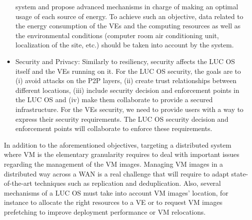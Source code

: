 \begin{itemize}
system and propose advanced mechanisms in charge of making an optimal usage of each source of energy. 
 To achieve such an objective, data related to the energy
  consumption of the VEs  and the computing resources
  as well as the environmental conditions (computer room air conditioning unit, localization of the
  site, etc.) should be taken into account by the system.
\item Security and Privacy: Similarly to resiliency, security affects the LUC OS itself and the VEs running on it.
For the LUC OS security, the goals are to (i) avoid attacks on the P2P layers, (ii) create trust relationships between different locations, 
(iii) include security decision and enforcement points in the LUC OS and (iv) make them collaborate to provide a secured infrastructure.
For the VEs security, we need to provide users with a way to express their security requirements. The LUC OS security decision and enforcement points will collaborate to enforce these requirements.
\end{itemize}

In addition to the aforementioned objectives, targeting a distributed system
where VM is the elementary granularity requires to deal with important issues
regarding the management of the VM images. Managing VM images in a distributed
way across a WAN is a real challenge that will require to adapt
state-of-the-art techniques such as replication and deduplication. Also,
several mechanisms of a LUC OS must take into account VM images'
location, for instance to allocate the right resources to a VE  or to request
VM images prefetching to improve deployment performance or VM relocations.

